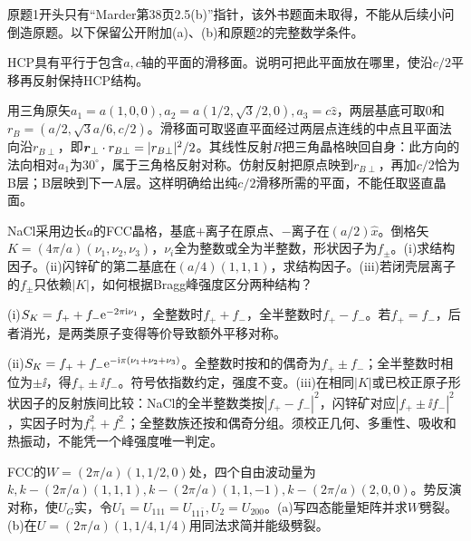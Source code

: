 原题1开头只有“Marder第38页2.5(b)”指针，该外书题面未取得，不能从后续小问倒造原题。以下保留公开附加(a)、(b)和原题2的完整数学条件。
\begin{exercise}[原题1(a)]
HCP具有平行于包含$a,c$轴的平面的滑移面。说明可把此平面放在哪里，使沿$c/2$平移再反射保持HCP结构。
\end{exercise}
\begin{solution}
用三角原矢$a_1=a(1,0,0),a_2=a(1/2,\sqrt3/2,0),a_3=c\hat z$，两层基底可取$0$和$r_B=(a/2,\sqrt3a/6,c/2)$。滑移面可取竖直平面经过两层点连线的中点且平面法向沿$r_{B\perp}$，即$\boldsymbol{r}_\perp\cdot r_{B\perp}=|r_{B\perp}|^2/2$。其线性反射$R$把三角晶格映回自身：此方向的法向相对$a_1$为$30^\circ$，属于三角格反射对称。仿射反射把原点映到$r_{B\perp}$，再加$c/2$恰为B层；B层映到下一A层。这样明确给出纯$c/2$滑移所需的平面，不能任取竖直晶面。
\end{solution}
\begin{exercise}
NaCl采用边长$a$的FCC晶格，基底$+$离子在原点、$-$离子在$(a/2)\hat x$。倒格矢$K=(4\pi/a)(\nu_1,\nu_2,\nu_3)$，$\nu_i$全为整数或全为半整数，形状因子为$f_\pm$。(i)求结构因子。(ii)闪锌矿的第二基底在$(a/4)(1,1,1)$，求结构因子。(iii)若闭壳层离子的$f_\pm$只依赖$|K|$，如何根据Bragg峰强度区分两种结构？
\end{exercise}
\begin{solution}
(i)$S_K=f_++f_-\mathrm e^{-2\pi\mathrm i\nu_1}$，全整数时$f_++f_-$，全半整数时$f_+-f_-$。若$f_+=f_-$，后者消光，是两类原子变得等价导致额外平移对称。

(ii)$S_K=f_++f_-\mathrm e^{-\mathrm i\pi(\nu_1+\nu_2+\nu_3)}$。全整数时按和的偶奇为$f_+\pm f_-$；全半整数时相位为$\pm\ii$，得$f_+\pm\ii f_-$。符号依指数约定，强度不变。(iii)在相同$|K|$或已校正原子形状因子的反射族间比较：NaCl的全半整数类按$|f_+-f_-|^2$，闪锌矿对应$|f_+\pm\ii f_-|^2$，实因子时为$f_+^2+f_-^2$；全整数族还按和偶奇分组。须校正几何、多重性、吸收和热振动，不能凭一个峰强度唯一判定。
\end{solution}
\begin{exercise}
FCC的$W=(2\pi/a)(1,1/2,0)$处，四个自由波动量为$k,k-(2\pi/a)(1,1,1),k-(2\pi/a)(1,1,-1),k-(2\pi/a)(2,0,0)$。势反演对称，使$U_G$实，令$U_1=U_{111}=U_{11\bar1},U_2=U_{200}$。(a)写四态能量矩阵并求$W$劈裂。(b)在$U=(2\pi/a)(1,1/4,1/4)$用同法求简并能级劈裂。
\end{exercise}
